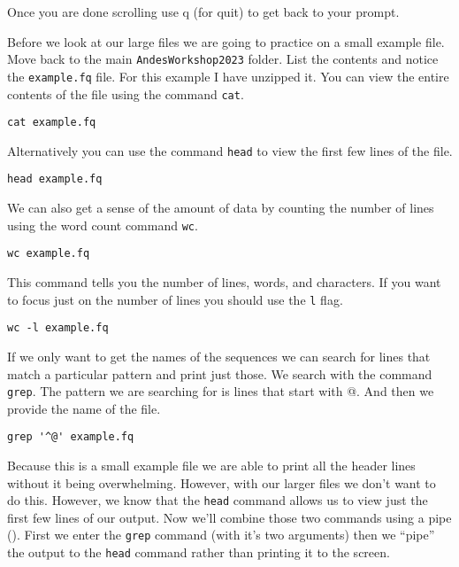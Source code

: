\documentclass[
]{book}
\begin{document}
Once you are done scrolling use q (for quit) to get back to your prompt.

Before we look at our large files we are going to practice on a small example file.
Move back to the main \texttt{AndesWorkshop2023} folder.
List the contents and notice the \texttt{example.fq} file.
For this example I have unzipped it.
You can view the entire contents of the file using the command \texttt{cat}.

\begin{verbatim}
cat example.fq
\end{verbatim}

Alternatively you can use the command \texttt{head} to view the first few lines of the file.

\begin{verbatim}
head example.fq
\end{verbatim}

We can also get a sense of the amount of data by counting the number of lines using the word count command \texttt{wc}.

\begin{verbatim}
wc example.fq
\end{verbatim}

This command tells you the number of lines, words, and characters. If you want to focus just on the number of lines you should use the \texttt{l} flag.

\begin{verbatim}
wc -l example.fq
\end{verbatim}

If we only want to get the names of the sequences we can search for lines that match a particular pattern and print just those. We search with the command \texttt{grep}. The pattern we are searching for is lines that start with @. And then we provide the name of the file.

\begin{verbatim}
grep '^@' example.fq
\end{verbatim}

Because this is a small example file we are able to print all the header lines without it being overwhelming. However, with our larger files we don't want to do this. However, we know that the \texttt{head} command allows us to view just the first few lines of our output. Now we'll combine those two commands using a pipe (\texttt{\textbar{}}). First we enter the \texttt{grep} command (with it's two arguments) then we ``pipe'' the output to the \texttt{head} command rather than printing it to the screen.
\end{document}
